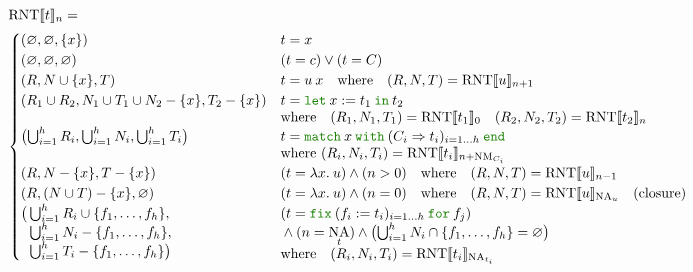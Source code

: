 \documentclass[a4paper,fleqn]{article}
\newcommand{\kwlet}{\mbox{\color{mygreen}\ttfamily let}}
\newcommand{\kwin}{\mbox{\color{mygreen}\ttfamily in}}
\newcommand{\kwmatch}{\mbox{\color{mygreen}\ttfamily match}}
\newcommand{\kwwith}{\mbox{\color{mygreen}\ttfamily with}}
\newcommand{\kwend}{\mbox{\color{mygreen}\ttfamily end}}
\newcommand{\kwfix}{\mbox{\color{mygreen}\ttfamily fix}}
\newcommand{\kwfor}{\mbox{\color{mygreen}\ttfamily for}}
\newcommand{\lam}[2]{\lambda #1.\:#2}
\newcommand{\letin}[3]{\kwlet\:#1:=#2\:\kwin\:#3}
\newcommand{\match}[4]{\kwmatch\:#1\:\kwwith\:(#2 \Rightarrow #3)_{#4}\:\kwend}
\newcommand{\fix}[4]{\kwfix\:(#1 := #2)_{#3}\:\kwfor\:#4}
\DeclareMathOperator{\NA}{NA} %
\DeclareMathOperator{\NM}{NM} %
\newcommand{\BRA}[1]{\llbracket #1 \rrbracket}
\DeclareMathOperator{\RNTop}{RNT}
\newcommand{\RNT}[2]{\RNTop\BRA{#1}_{#2}}
\begin{document}
\begin{align*}
  &\RNT{t}{n} = \\
  &\begin{cases}
    (\varnothing, \varnothing, \{x\})             & t = x \\
    (\varnothing, \varnothing, \varnothing)         & (t = c) \vee (t = C) \\
    (R, N \cup \{x\}, T)         & t = u\:x \quad \text{where}\quad (R,N,T) = \RNT{u}{n+1} \\
    (R_1 \cup R_2, N_1 \cup T_1 \cup N_2 - \{x\}, T_2 - \{x\})        &
      \begin{aligned}[t]
        & t = \letin{x}{t_1}{t_2} \\
        & \text{where}\quad (R_1,N_1,T_1) = \RNT{t_1}{0} \quad (R_2,N_2,T_2) = \RNT{t_2}{n}
      \end{aligned} \\
    \bigl(\bigcup_{i=1}^h R_i, \bigcup_{i=1}^h N_i, \bigcup_{i=1}^h T_i \bigr)         &
      \begin{aligned}[t]
        & t = \match{x}{C_i}{t_i}{i=1\ldots h} \\
        & \text{where}~(R_i, N_i, T_i) = \RNT{t_i}{n+\NM_{C_i}}
      \end{aligned} \\
    (R, N-\{x\}, T - \{x\})                                           & (t = \lam{x}{u}) \wedge (n > 0) \quad \text{where}\quad  (R, N, T) = \RNT{u}{n-1} \\
    (R, (N \cup T) - \{x\}, \varnothing)                             & (t = \lam{x}{u}) \wedge (n = 0) \quad \text{where}\quad  (R, N, T) = \RNT{u}{\NA_u} \quad \text{(closure)} \\
    \begin{aligned}[t]
      \bigl( & \textstyle\bigcup_{i=1}^h R_i \cup \{f_1,\dotsc, f_h\}, \\
             & \textstyle\bigcup_{i=1}^h N_i - \{f_1,\dotsc, f_h\}, \\
             & \textstyle\bigcup_{i=1}^h T_i - \{f_1,\dotsc, f_h\} \bigr)
    \end{aligned} &
      \begin{aligned}[t]
        & (t = \fix{f_i}{t_i}{i=1\ldots h}{f_j}) \\
        & {} \wedge (n = \NA_t) \wedge \bigl(\textstyle\bigcup_{i=1}^h N_i \cap \{f_1,\dotsc, f_h\} = \varnothing\bigr) \\
        & \text{where}\quad (R_i, N_i, T_i) = \RNT{t_i}{\NA_{t_i}}
      \end{aligned} \\

\end{cases}
\end{align*}
\end{document}
